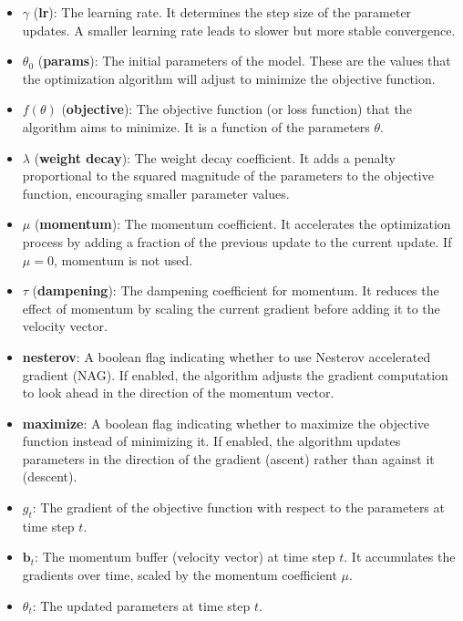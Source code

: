 \documentclass{article}
\begin{document}
\begin{itemize}
    \item \(\gamma\) (\textbf{lr}): The learning rate. It determines the step size of the parameter updates. A smaller learning rate leads to slower but more stable convergence.
    
    \item \(\theta_0\) (\textbf{params}): The initial parameters of the model. These are the values that the optimization algorithm will adjust to minimize the objective function.
    
    \item \(f(\theta)\) (\textbf{objective}): The objective function (or loss function) that the algorithm aims to minimize. It is a function of the parameters \(\theta\).
    
    \item \(\lambda\) (\textbf{weight decay}): The weight decay coefficient. It adds a penalty proportional to the squared magnitude of the parameters to the objective function, encouraging smaller parameter values.
    
    \item \(\mu\) (\textbf{momentum}): The momentum coefficient. It accelerates the optimization process by adding a fraction of the previous update to the current update. If \(\mu = 0\), momentum is not used.
    
    \item \(\tau\) (\textbf{dampening}): The dampening coefficient for momentum. It reduces the effect of momentum by scaling the current gradient before adding it to the velocity vector.
    
    \item \textbf{nesterov}: A boolean flag indicating whether to use Nesterov accelerated gradient (NAG). If enabled, the algorithm adjusts the gradient computation to look ahead in the direction of the momentum vector.
    
    \item \textbf{maximize}: A boolean flag indicating whether to maximize the objective function instead of minimizing it. If enabled, the algorithm updates parameters in the direction of the gradient (ascent) rather than against it (descent).
    
    \item \(g_t\): The gradient of the objective function with respect to the parameters at time step \(t\).
    
    \item \(\textbf{b}_t\): The momentum buffer (velocity vector) at time step \(t\). It accumulates the gradients over time, scaled by the momentum coefficient \(\mu\).
    
    \item \(\theta_t\): The updated parameters at time step \(t\).
\end{itemize}
\end{document}
